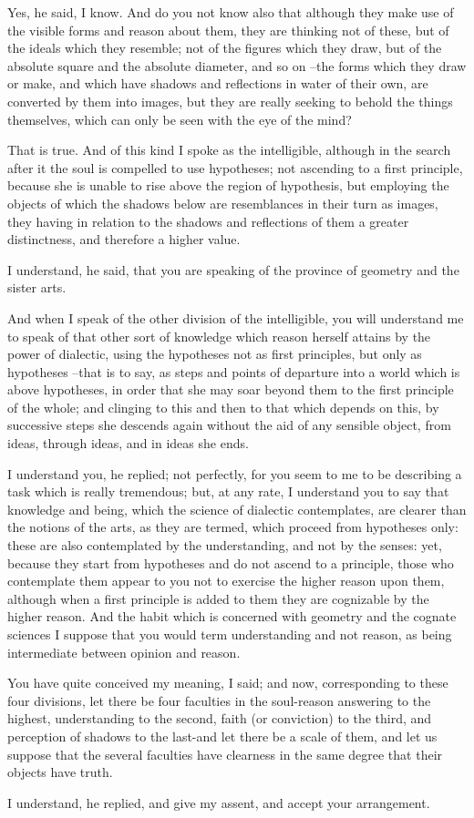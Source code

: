 Yes, he said, I know.
And do you not know also that although they make use of the visible forms and reason about them, they are thinking not of these, but of the ideals which they resemble; not of the figures which they draw, but of the absolute square and the absolute diameter, and so on --the forms which they draw or make, and which have shadows and reflections in water of their own, are converted by them into images, but they are really seeking to behold the things themselves, which can only be seen with the eye of the mind?

That is true.
And of this kind I spoke as the intelligible, although in the search after it the soul is compelled to use hypotheses; not ascending to a first principle, because she is unable to rise above the region of hypothesis, but employing the objects of which the shadows below are resemblances in their turn as images, they having in relation to the shadows and reflections of them a greater distinctness, and therefore a higher value.

I understand, he said, that you are speaking of the province of geometry and the sister arts.

And when I speak of the other division of the intelligible, you will understand me to speak of that other sort of knowledge which reason herself attains by the power of dialectic, using the hypotheses not as first principles, but only as hypotheses --that is to say, as steps and points of departure into a world which is above hypotheses, in order that she may soar beyond them to the first principle of the whole; and clinging to this and then to that which depends on this, by successive steps she descends again without the aid of any sensible object, from ideas, through ideas, and in ideas she ends.

I understand you, he replied; not perfectly, for you seem to me to be describing a task which is really tremendous; but, at any rate, I understand you to say that knowledge and being, which the science of dialectic contemplates, are clearer than the notions of the arts, as they are termed, which proceed from hypotheses only: these are also contemplated by the understanding, and not by the senses: yet, because they start from hypotheses and do not ascend to a principle, those who contemplate them appear to you not to exercise the higher reason upon them, although when a first principle is added to them they are cognizable by the higher reason. And the habit which is concerned with geometry and the cognate sciences I suppose that you would term understanding and not reason, as being intermediate between opinion and reason.

You have quite conceived my meaning, I said; and now, corresponding to these four divisions, let there be four faculties in the soul-reason answering to the highest, understanding to the second, faith (or conviction) to the third, and perception of shadows to the last-and let there be a scale of them, and let us suppose that the several faculties have clearness in the same degree that their objects have truth.

I understand, he replied, and give my assent, and accept your arrangement.